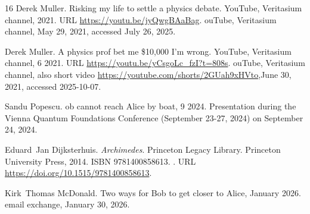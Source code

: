 \documentclass[a4paper]{article}
\begin{document}
\begin{thebibliography}{16}
Derek Muller.
\newblock Risking my life to settle a physics debate.
\newblock YouTube, Veritasium channel, 2021{}.
\newblock URL \url{https://youtu.be/jyQwgBAaBag}.
ouTube, Veritasium channel, May 29, 2021, accessed July 26, 2025.

Derek Muller.
\newblock A physics prof bet me \$10,000 {I}'m wrong.
\newblock YouTube, Veritasium channel, 6 2021{}.
\newblock URL \url{https://youtu.be/yCsgoLc_fzI?t=808s}.
ouTube, Veritasium channel, also short video
  \url{https://youtube.com/shorts/2GUah9xHVto},June 30, 2021, accessed
  2025-10-07.

Sandu Popescu.
ob cannot reach {A}lice by boat, 9 2024.
\newblock Presentation during the Vienna Quantum Foundations Conference
  (September 23-27, 2024) on September 24, 2024.

Eduard~Jan Dijksterhuis.
\newblock \emph{Archimedes}.
\newblock Princeton Legacy Library. Princeton University Press, 2014.
\newblock ISBN 9781400858613.
\newblock {}.
\newblock URL \url{https://doi.org/10.1515/9781400858613}.

Kirk~Thomas McDonald.
\newblock Two ways for {B}ob to get closer to {A}lice, January 2026.
\newblock email exchange, January 30, 2026.

\end{thebibliography}
\end{document}

